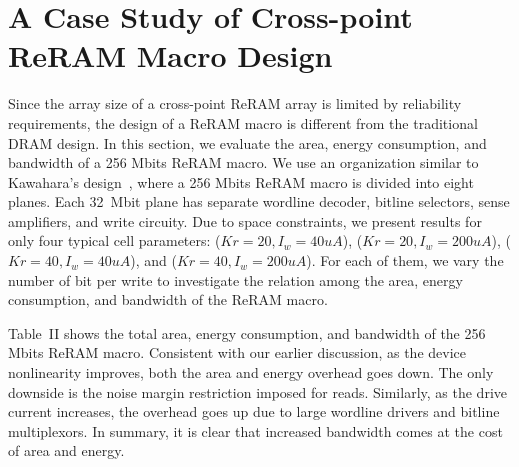 \vspace{-5pt}
\section{A Case Study of Cross-point ReRAM Macro Design}\label{sec:macro}
Since the array size of a cross-point ReRAM array is limited by
reliability requirements, the design of a ReRAM macro is different
from the traditional DRAM design. 
In this section, we evaluate the area, energy consumption, and bandwidth of a
256 Mbits ReRAM macro.
We use an organization similar to Kawahara's design~\cite{crossbar_Panasonic}, where
a 256 Mbits ReRAM macro is divided into 
eight planes. Each 32~Mbit plane has separate wordline
decoder, bitline selectors, sense amplifiers, and write circuity. Due to
space constraints, we present results for only
four typical cell parameters: ($Kr=20,
I_w=40uA$), ($Kr=20, I_w=200uA$), ($Kr=40, I_w=40uA$), and ($Kr=40,
I_w=200uA$). For each of them, we vary the number of bit per write to
investigate the relation among the area, energy consumption, and bandwidth
of the ReRAM macro.


Table~II shows the total area, energy consumption, and bandwidth of the
256 Mbits ReRAM macro. Consistent with our earlier discussion, 
as the device nonlinearity improves, both the area and energy 
overhead goes down. The only downside is the noise margin restriction
imposed for reads. Similarly, as the drive current increases, the overhead
goes up due to large wordline drivers and bitline multiplexors. 
In summary, it is clear that increased bandwidth comes at the cost of area
and energy. 

